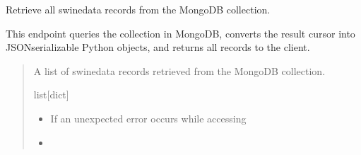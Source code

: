 \documentclass[letterpaper,10pt,english]{sphinxmanual}
\begin{document}
\begin{fulllineitems}
\label{\detokenize{modules/src.pig_sorting_api.main:src.pig_sorting_api.main.get_swinedata}}
\pysigstartsignatures
\pysiglinewithargsret
{}
{}
{}
\pysigstopsignatures
\sphinxAtStartPar
Retrieve all swinedata records from the MongoDB collection.

\sphinxAtStartPar
This endpoint queries the  collection in MongoDB,
converts the result cursor into JSON\sphinxhyphen{}serializable Python objects,
and returns all records to the client.
\begin{quote}\begin{description}
\sphinxAtStartPar
A list of swinedata records retrieved from the
 MongoDB collection.

\sphinxAtStartPar
list{[}dict{]}

\begin{itemize}
\item {} 
\sphinxAtStartPar
{} \textendash{} If an unexpected error occurs while accessing

\item {} 
\sphinxAtStartPar
{} \textendash{} 

\end{itemize}

\end{description}\end{quote}

\end{fulllineitems}

\end{document}
